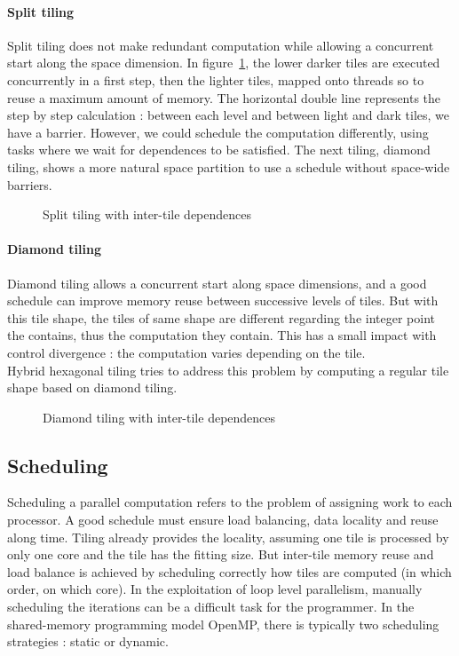 \documentclass[a4paper,11pt]{article}
\begin{document}
 \paragraph{Split tiling} Split tiling \cite{grosser_split_2013} does not make redundant computation while 
 allowing a concurrent start along the space dimension. In figure~\ref{split-tiling}, the lower 
 darker tiles are executed
 concurrently in a first step, then the lighter tiles, mapped onto threads so to reuse a
maximum amount of memory. The horizontal double line represents the step by step calculation : 
between each level and between light and dark tiles, we have a barrier. However,
we could schedule the computation differently, using tasks where we wait for dependences
to be satisfied. The next tiling, diamond tiling, shows a more natural space partition to
use a schedule without space-wide barriers.

   \vspace{1cm}
  \begin{figure}[h]
   
   \caption{Split tiling with inter-tile dependences}
   \label{split-tiling}
  \end{figure}
  
  \paragraph{Diamond tiling}
  Diamond tiling \cite{bandishti_tiling_2012} allows a concurrent start along space dimensions,
  and a good schedule can improve memory reuse between successive levels of tiles. But with this
  tile shape, the tiles of same shape are different regarding the integer point the contains, thus
  the computation they contain. This has a small impact with control divergence : the computation 
  varies depending on the tile. \\
  Hybrid hexagonal tiling \cite{grosser_relation_2014} tries to address this problem by computing
  a regular tile shape based on diamond tiling.
    \vspace{1cm}
   \begin{figure}[h]
   
   \caption{Diamond tiling with inter-tile dependences}
   \label{diam-tiling}
  \end{figure}
  
 
\subsection{Scheduling}
Scheduling a parallel computation refers to the problem of assigning work to each processor. 
A good schedule must ensure load balancing, data locality and reuse along time.
Tiling already provides the locality, assuming one tile is processed by only one core and
the tile has the fitting size. But inter-tile memory reuse and load balance is achieved by
scheduling correctly how tiles are computed (in which order, on which core).
In the exploitation of loop level parallelism, manually scheduling the iterations can be a
difficult task for the programmer. In the shared-memory programming model OpenMP,
there is typically two scheduling strategies : static or dynamic. \\
\end{document}
